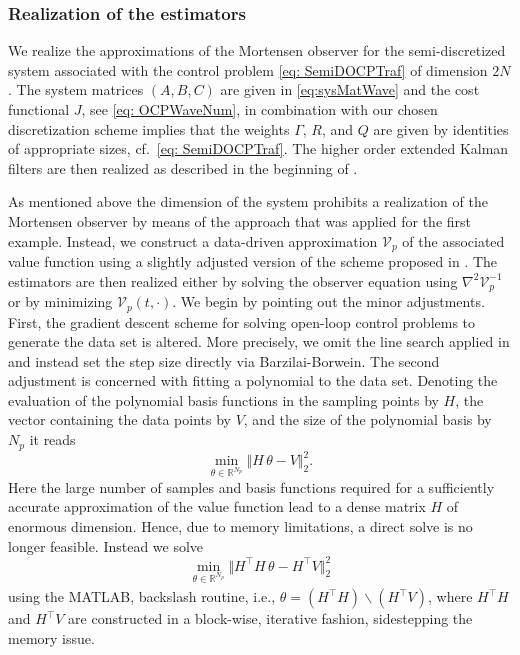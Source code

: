 \documentclass[11pt,reqno]{amsart}
\numberwithin{equation}{section}
\theoremstyle{plain}
\newcommand{\Matlab}{MATLAB\textsuperscript{\textregistered}}
\begin{document}
%
\subsubsection{Realization of the estimators}\label{subsubsec:WaveMort}
%
We realize the approximations of the Mortensen observer for the semi-discretized system associated with the control problem \eqref{eq: SemiDOCPTraf} of dimension $2N$. The system matrices $(A,B,C)$ are given in \eqref{eq:sysMatWave} and the cost functional $J$, see \eqref{eq: OCPWaveNum}, in combination with our chosen discretization scheme implies that the weights $\Gamma$, $R$, and $Q$ are given by identities of appropriate sizes, cf.~\eqref{eq: SemiDOCPTraf}. The higher order extended Kalman filters are then realized as described in the beginning of . 

As mentioned above the dimension of the system prohibits a realization of the Mortensen observer by means of the approach that was applied for the first example. Instead, we construct a data-driven approximation $\mathcal{V}_p$ of the associated value function using a slightly adjusted version of the scheme proposed in \cite{BreKuSc23}. The estimators are then realized either by solving the observer equation using $\nabla^2 \mathcal{V}_p^{-1}$ or by minimizing $\mathcal{V}_p(t,\cdot)$. 
We begin by pointing out the minor adjustments. First, the gradient descent scheme for solving open-loop control problems to generate the data set is altered. More precisely, we omit the line search applied in \cite[Alg.~3.1]{BreKuSc23} and instead set the step size directly via Barzilai-Borwein.
The second adjustment is concerned with fitting a polynomial to the data set. Denoting the evaluation of the polynomial basis functions in the sampling points by $H$, the vector containing the data points by $V$, and the size of the polynomial basis by $N_p$ it reads
%
\begin{equation*}
    \min_{\theta \in \mathbb{R}^{N_p}}
	\Vert H \, \theta - V \Vert_2^2.
\end{equation*}
%
Here the large number of samples and basis functions required for a sufficiently accurate approximation of the value function lead to a dense matrix $H$ of enormous dimension. Hence, due to memory limitations, 
a direct solve is no longer feasible. 
Instead we solve
%
\begin{equation*}
	\min_{\theta \in \mathbb{R}^{N_p}}
	\Vert H^\top H \, \theta - H^\top V \Vert_2^2
\end{equation*}
%
using the \Matlab, backslash routine, i.e., $\theta = (H^\top H) \backslash (H^\top V) $, where $H^\top H$ and $H^\top V$ are constructed in a block-wise, iterative fashion, sidestepping the memory issue.
\end{document}
